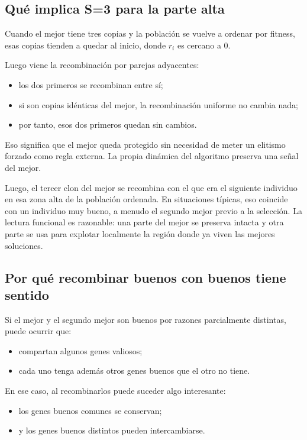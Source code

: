 \documentclass[11pt]{article}
\begin{document}
\subsection{Qu\'e implica S=3 para la parte alta}

Cuando el mejor tiene tres copias y la poblaci\'on se vuelve a ordenar por
fitness, esas copias tienden a quedar al inicio, donde \(r_i\) es cercano a
\(0\).

Luego viene la recombinaci\'on por parejas adyacentes:

\begin{itemize}
  \item los dos primeros se recombinan entre s\'i;
  \item si son copias id\'enticas del mejor, la recombinaci\'on uniforme no
  cambia nada;
  \item por tanto, esos dos primeros quedan sin cambios.
\end{itemize}

Eso significa que el mejor queda protegido sin necesidad de meter un elitismo
forzado como regla externa. La propia din\'amica del algoritmo preserva una
se\~nal del mejor.

Luego, el tercer clon del mejor se recombina con el que era el siguiente
individuo en esa zona alta de la poblaci\'on ordenada. En situaciones t\'ipicas,
eso coincide con un individuo muy bueno, a menudo el segundo mejor previo a la
selecci\'on. La
lectura funcional es razonable: una parte del mejor se preserva intacta y otra
parte se usa para explotar localmente la regi\'on donde ya viven las mejores
soluciones.

\subsection{Por qu\'e recombinar buenos con buenos tiene sentido}

Si el mejor y el segundo mejor son buenos por razones parcialmente distintas,
puede ocurrir que:

\begin{itemize}
  \item compartan algunos genes valiosos;
  \item cada uno tenga adem\'as otros genes buenos que el otro no tiene.
\end{itemize}

En ese caso, al recombinarlos puede suceder algo interesante:

\begin{itemize}
  \item los genes buenos comunes se conservan;
  \item y los genes buenos distintos pueden intercambiarse.
\end{itemize}
\end{document}
